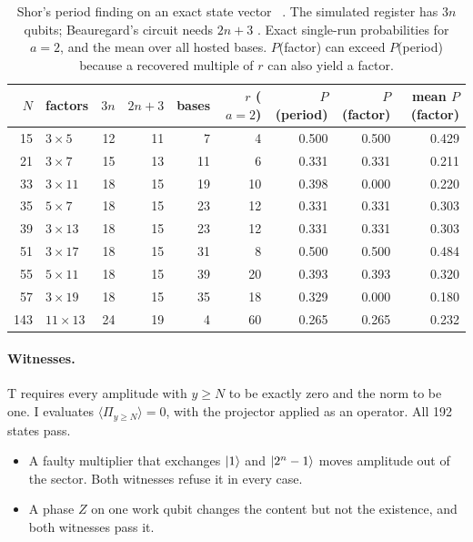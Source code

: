 \begin{table}[htb]\centering\footnotesize
\caption{Shor's period finding on an exact state vector \tagS~. The simulated register has $3n$ qubits; Beauregard's
circuit needs $2n+3$ \cite{beauregard2003}. Exact single-run probabilities for $a=2$, and the mean over all hosted bases. $P$(factor) can
exceed $P$(period) because a recovered multiple of $r$ can also yield a factor.}\label{tab:hosted:shor}
\begin{tabular}{@{}rlrrrrrrr@{}}
\toprule
$N$ & factors & $3n$ & $2n+3$ & bases & $r$ ($a=2$) & $P$(period) & $P$(factor) & mean $P$(factor)\\
\midrule
15 & $3\times5$ & 12 & 11 & 7 & 4 & 0.500 & 0.500 & 0.429\\
21 & $3\times7$ & 15 & 13 & 11 & 6 & 0.331 & 0.331 & 0.211\\
33 & $3\times11$ & 18 & 15 & 19 & 10 & 0.398 & 0.000 & 0.220\\
35 & $5\times7$ & 18 & 15 & 23 & 12 & 0.331 & 0.331 & 0.303\\
39 & $3\times13$ & 18 & 15 & 23 & 12 & 0.331 & 0.331 & 0.303\\
51 & $3\times17$ & 18 & 15 & 31 & 8 & 0.500 & 0.500 & 0.484\\
55 & $5\times11$ & 18 & 15 & 39 & 20 & 0.393 & 0.393 & 0.320\\
57 & $3\times19$ & 18 & 15 & 35 & 18 & 0.329 & 0.000 & 0.180\\
143 & $11\times13$ & 24 & 19 & 4 & 60 & 0.265 & 0.265 & 0.232\\
\bottomrule
\end{tabular}
\end{table}

\paragraph{Witnesses.} T requires every amplitude with $y\ge N$ to be exactly zero and the norm to be one. I evaluates
$\langle\Pi_{y\ge N}\rangle=0$, with the projector applied as an operator. All 192 states pass.
\begin{itemize}[nosep]
\item A faulty multiplier that exchanges $\lvert 1\rangle$ and $\lvert 2^n-1\rangle$ moves amplitude out of the sector. Both witnesses refuse it in every
case.
\item A phase $Z$ on one work qubit changes the content but not the existence, and both witnesses pass it.
\end{itemize}


